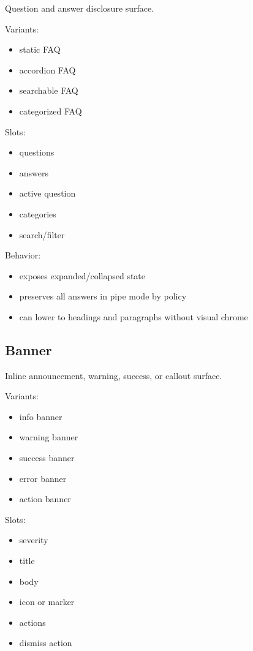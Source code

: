 Question and answer disclosure surface.

Variants:

\begin{itemize}
\tightlist
\item
  static FAQ
\item
  accordion FAQ
\item
  searchable FAQ
\item
  categorized FAQ
\end{itemize}

Slots:

\begin{itemize}
\tightlist
\item
  questions
\item
  answers
\item
  active question
\item
  categories
\item
  search/filter
\end{itemize}

Behavior:

\begin{itemize}
\tightlist
\item
  exposes expanded/collapsed state
\item
  preserves all answers in pipe mode by policy
\item
  can lower to headings and paragraphs without visual chrome
\end{itemize}

\subsection{Banner}\label{record-128-banner}

Inline announcement, warning, success, or callout surface.

Variants:

\begin{itemize}
\tightlist
\item
  info banner
\item
  warning banner
\item
  success banner
\item
  error banner
\item
  action banner
\end{itemize}

Slots:

\begin{itemize}
\tightlist
\item
  severity
\item
  title
\item
  body
\item
  icon or marker
\item
  actions
\item
  dismiss action
\end{itemize}

